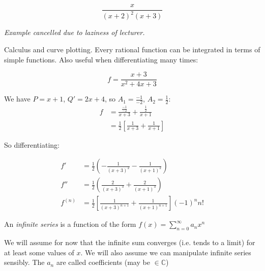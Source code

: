 \documentclass[twoside]{scrartcl}
\begin{document}
\begin{example}
\[	\frac{x}{(x+2)^2(x+3)}\]
	
\emph{Example cancelled due to laziness of lecturer.}
\end{example}\vspace*{5pt}


Calculus and curve plotting. Every rational function can be integrated in terms of simple functions. Also useful when differentiating many times:\\

\begin{example}
\[f = \frac{x+3}{x^2 + 4x + 3}\]

We have $P = x+1$, $Q'=  2x+4$, so $A_1 = \frac{-1}{-2}$, $A_2 = \frac{1}{2}$: 
	\[
\begin{aligned}
 f &= \frac{\frac{-1}{-2}}{x+3} + \frac{\frac{1}{2}}{x+1}\\
  &= \frac{1}{2}\left[\frac{1}{x+3} + \frac{1}{x+1}\right]
\end{aligned}
\]

So differentiating: 

\[
\begin{aligned}
  f' &= \frac{1}{2}\left(-\frac{1}{(x+3)^2} - \frac{1}{(x+1)^2}\right)\\
  f'' &= \frac{1}{2}\left(\frac{2}{(x+3)^3} + \frac{2}{(x+1)^3}\right)\\
  f^{(n)} &= \frac{1}{2}\left[\frac{1}{(x+3)^{n+1}} + \frac{1}{(x+1)^{n+1}}\right](-1)^nn!
\end{aligned}
\]


\end{example}


\pagebreak



\vspace*{5pt}

\begin{definition}An \emph{infinite series} is a  function of the form $f(x) = \sum_{n=0}^{\infty} a_n x^n$\end{definition}

We will assume for now that the infinite sum converges (i.e. tends to a limit) for at least some values of $x$. We will also assume we can manipulate infinite series sensibly. The $a_n$ are called coefficients (may be $\in \mathbb{C}$)

\end{document}
